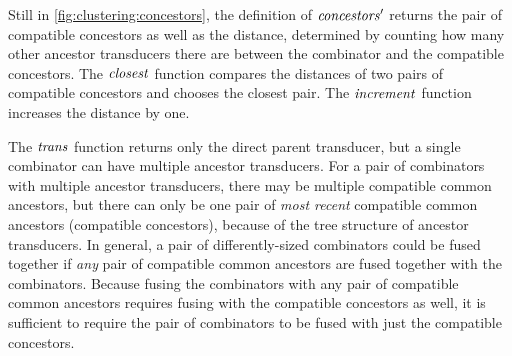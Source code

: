 Still in \cref{fig:clustering:concestors}, the definition of $\mathit{concestors}'$ returns the pair of compatible concestors as well as the distance, determined by counting how many other ancestor transducers there are between the combinator and the compatible concestors.
The $\mathit{closest}$ function compares the distances of two pairs of compatible concestors and chooses the closest pair.
The $\mathit{increment}$ function increases the distance by one.

The $\mathit{trans}$ function returns only the direct parent transducer, but a single combinator can have multiple ancestor transducers.
For a pair of combinators with multiple ancestor transducers, there may be multiple compatible common ancestors, but there can only be one pair of \emph{most recent} compatible common ancestors (compatible concestors), because of the tree structure of ancestor transducers.
In general, a pair of differently-sized combinators could be fused together if \emph{any} pair of compatible common ancestors are fused together with the combinators.
Because fusing the combinators with any pair of compatible common ancestors requires fusing with the compatible concestors as well, it is sufficient to require the pair of combinators to be fused with just the compatible concestors.



